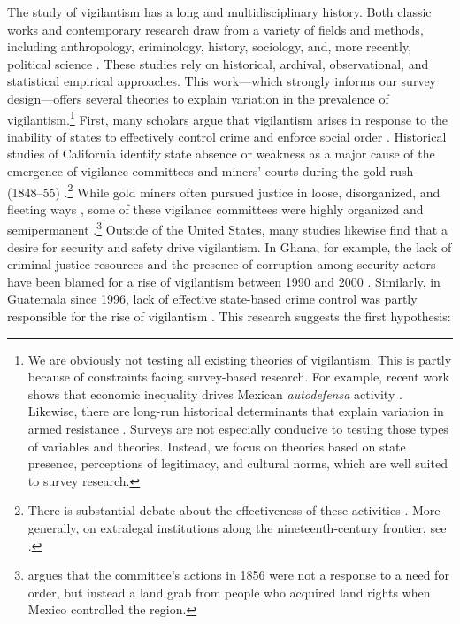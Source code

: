 \documentclass[12pt,a4paper]{article}
\begin{document}
The study of vigilantism has a long and multidisciplinary history. Both classic works and contemporary research draw from a variety of fields and methods, including anthropology, criminology, history, sociology, and, more recently, political science \citep{moncada2017varieties}. These studies rely on historical, archival, observational, and statistical empirical approaches. This work---which strongly informs our survey design---offers several theories to explain variation in the prevalence of vigilantism.\footnote{We are obviously not testing all existing theories of vigilantism. This is partly because of constraints facing survey-based research. For example,  recent work shows that economic inequality drives Mexican \textit{autodefensa} activity \citep{phillips2017inequality}. Likewise, there are  long-run historical determinants that explain variation in armed resistance \citep{Osorio2019mexico}. Surveys are not especially conducive to testing those types of variables and theories. Instead, we focus on theories based on state presence, perceptions of legitimacy, and cultural norms, which are well suited to survey research.}  First, many scholars argue that vigilantism arises in response to the inability of states to effectively control crime and enforce social order \citep{bancroft1887works}. Historical studies of California identify state absence or weakness as a major cause of the emergence of vigilance committees and miners' courts during the gold rush (1848--55) \citep{hunt1920committees,rohrbough1997days,couttenier2017wild}.\footnote{There is substantial debate about the effectiveness of these activities \citep{clay2003order}. More generally, on extralegal institutions along the nineteenth-century frontier, see \cite{murtazashvili2013political}.} While gold miners often pursued justice in loose, disorganized, and fleeting ways \citep{mcdowell2002commons,mcdowell2007criminal}, some of these vigilance committees were highly organized and semipermanent \citep{bancroft1887works}.\footnote{\citet{taniguchi2016dirty} argues that the committee's actions in 1856 were not a response to a need for order, but instead a land grab from people who acquired land rights when Mexico controlled the region.} Outside of the United States, many studies likewise find that a desire for security and safety drive vigilantism. In Ghana, for example, the lack of criminal justice resources and the presence of corruption among security actors have been blamed for a rise of vigilantism between 1990 and 2000 \citep[416]{adinkrah2005vigilante}. Similarly, in  Guatemala since 1996, lack of effective state-based crime control was partly responsible for the rise of vigilantism \citep{godoy2006popular}. This research suggests the first hypothesis:
\end{document}
